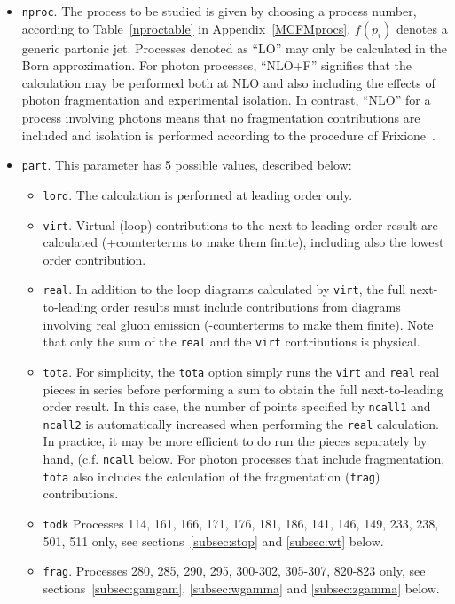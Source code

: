 \documentclass[12pt]{article}
\begin{document}
\begin{itemize}
\begin{center}
\{blank line\} \\
{\tt [General options to specify the process and execution] }
\end{center}

\item {\tt nproc}.
The process to be studied is given by
choosing a process number, according to Table~\ref{nproctable}
in Appendix~\ref{MCFMprocs}.
$f(p_i)$ denotes a generic partonic jet. Processes denoted as
``LO'' may only be calculated in the Born approximation. For photon
processes, ``NLO+F'' signifies that the calculation may be performed
both at NLO and also including the effects of photon fragmentation
and experimental isolation. In contrast, ``NLO'' for a process involving
photons means that no fragmentation contributions are included and isolation
is performed according to the procedure of Frixione~\cite{Frixione:1998jh}.
\item {\tt part}.
This parameter has 5 possible values, described below:
\begin{itemize}
\item {\tt lord}.
The calculation is performed at leading order only.
\item {\tt virt}.
Virtual (loop) contributions to the next-to-leading order result are
calculated (+counterterms to make them finite), including also the
lowest order contribution.
\item {\tt real}.
In addition to the loop diagrams calculated by {\tt virt}, the full
next-to-leading order results must include contributions from diagrams
involving real gluon emission (-counterterms to make them finite).
Note that only the sum of the {\tt real} and the {\tt virt} contributions
is physical.
\item {\tt tota}.
For simplicity, the {\tt tota} option simply runs the {\tt virt} and
{\tt real} real pieces in series before performing a sum to obtain
the full next-to-leading order result. In this case, the number of
points specified by {\tt ncall1} and {\tt ncall2} is automatically
increased when performing the {\tt real} calculation. In practice,
it may be more efficient to do run the pieces separately by hand, 
(c.f. {\tt ncall} below. For photon processes that include fragmentation,
{\tt tota} also includes the calculation of the fragmentation ({\tt frag})
contributions.
\item {\tt todk}
Processes 114, 161, 166, 171, 176, 181, 186, 141, 146, 149, 233, 238, 501, 511 only, see sections~\ref{subsec:stop} and
\ref{subsec:wt} below.
\item {\tt frag}.
Processes 280, 285, 290, 295, 300-302, 305-307,  820-823 only, see sections~\ref{subsec:gamgam}, \ref{subsec:wgamma} and
\ref{subsec:zgamma} below.


\end{itemize}
\end{itemize}
\end{document}
